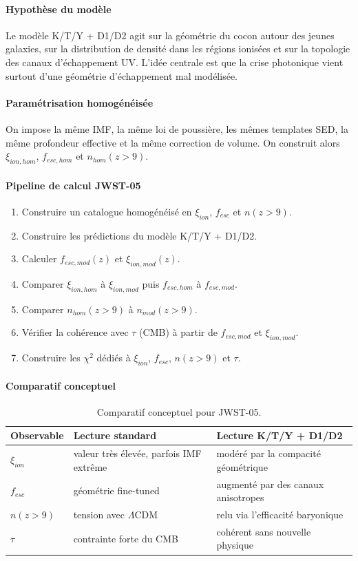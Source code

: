 \documentclass[11pt,a4paper]{article}
\begin{document}
\paragraph{Hypothèse du modèle}
Le modèle K/T/Y + D1/D2 agit sur la géométrie du cocon autour des jeunes galaxies, sur la distribution de densité dans les régions ionisées et sur la topologie des canaux d'échappement UV. L'idée centrale est que la crise photonique vient surtout d'une géométrie d'échappement mal modélisée.

\paragraph{Paramétrisation homogénéisée}
On impose la même IMF, la même loi de poussière, les mêmes templates SED, la même profondeur effective et la même correction de volume. On construit alors $\xi_{ion,hom}$, $f_{esc,hom}$ et $n_{hom}(z>9)$.

\paragraph{Pipeline de calcul JWST-05}
\begin{enumerate}[leftmargin=*,itemsep=0.2em,topsep=0.2em]
\item Construire un catalogue homogénéisé en $\xi_{ion}$, $f_{esc}$ et $n(z>9)$.
\item Construire les prédictions du modèle K/T/Y + D1/D2.
\item Calculer $f_{esc,mod}(z)$ et $\xi_{ion,mod}(z)$.
\item Comparer $\xi_{ion,hom}$ à $\xi_{ion,mod}$ puis $f_{esc,hom}$ à $f_{esc,mod}$.
\item Comparer $n_{hom}(z>9)$ à $n_{mod}(z>9)$.
\item Vérifier la cohérence avec $\tau$ (CMB) à partir de $f_{esc,mod}$ et $\xi_{ion,mod}$.
\item Construire les $\chi^2$ dédiés à $\xi_{ion}$, $f_{esc}$, $n(z>9)$ et $\tau$.
\end{enumerate}

\paragraph{Comparatif conceptuel}
\begin{table}[htbp]
\centering
\begin{tabular}{>{\raggedright\arraybackslash}p{4cm} >{\raggedright\arraybackslash}p{5.2cm} >{\raggedright\arraybackslash}p{5.2cm}}
\toprule
Observable & Lecture standard & Lecture K/T/Y + D1/D2 \\
\midrule
$\xi_{ion}$ & valeur très élevée, parfois IMF extrême & modéré par la compacité géométrique \\
$f_{esc}$ & géométrie fine-tuned & augmenté par des canaux anisotropes \\
$n(z>9)$ & tension avec $\Lambda$CDM & relu via l'efficacité baryonique \\
$\tau$ & contrainte forte du CMB & cohérent sans nouvelle physique \\
\bottomrule
\end{tabular}
\caption{Comparatif conceptuel pour JWST-05.}
\end{table}
\end{document}

